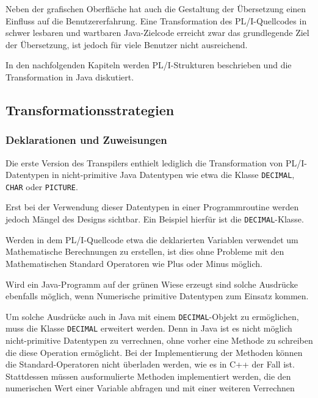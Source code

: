 Neben der grafischen Oberfläche hat auch die Gestaltung der Übersetzung einen Einfluss auf die Benutzererfahrung. Eine Transformation des PL/I-Quellcodes in schwer lesbaren und wartbaren Java-Zielcode erreicht zwar das grundlegende Ziel der Übersetzung, ist jedoch für viele Benutzer nicht ausreichend.

In den nachfolgenden Kapiteln werden PL/I-Strukturen beschrieben und die Transformation in Java diskutiert.

\pagebreak





\subsection{Transformationsstrategien}
\subsubsection{Deklarationen und Zuweisungen}
Die erste Version des Transpilers enthielt lediglich die Transformation von PL/I-Datentypen in nicht-primitive Java Datentypen wie etwa die Klasse \verb+DECIMAL+, \verb+CHAR+ oder \verb+PICTURE+.


Erst bei der Verwendung dieser Datentypen in einer Programmroutine werden jedoch Mängel des Designs sichtbar. Ein Beispiel hierfür ist die \verb+DECIMAL+-Klasse.

Werden in dem PL/I-Quellcode etwa die deklarierten Variablen verwendet um Mathematische Berechnungen zu erstellen, ist dies ohne Probleme mit den Mathematischen Standard Operatoren wie Plus oder Minus möglich.

Wird ein Java-Programm auf der grünen Wiese erzeugt sind solche Ausdrücke ebenfalls möglich, wenn Numerische primitive Datentypen zum Einsatz kommen.

Um solche Ausdrücke auch in Java mit einem \verb+DECIMAL+-Objekt zu ermöglichen, muss die Klasse \verb+DECIMAL+ erweitert werden.
Denn in Java ist es nicht möglich nicht-primitive Datentypen zu verrechnen, ohne vorher eine Methode zu schreiben die diese Operation ermöglicht. 
Bei der Implementierung der Methoden können die Standard-Operatoren nicht überladen werden, wie es in C++ der Fall ist.
Stattdessen müssen ausformulierte Methoden implementiert werden, die den numerischen Wert einer Variable abfragen und mit einer weiteren Verrechnen

